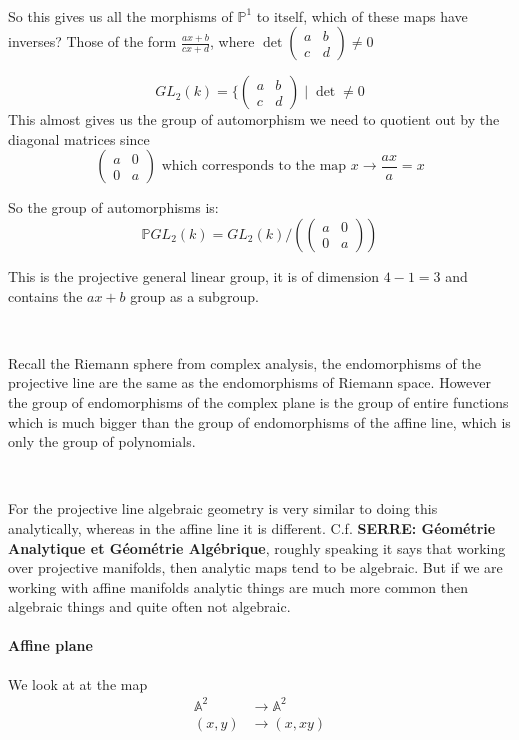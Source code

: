 \

So this gives us all the morphisms of $\mathbb{P}^1$ to itself, which of these maps have inverses? Those of the form $\frac{ax+b}{cx+d}$, where $\det\begin{pmatrix}
    a&b\\c&d
\end{pmatrix}\neq 0$

\[GL_2(k) = \{\begin{pmatrix}
    a&b\\c&d
\end{pmatrix}\mid \det\neq 0\]This almost gives us the group of automorphism we need to quotient out by the diagonal matrices since \[\begin{pmatrix}
    a&0\\0&a
\end{pmatrix} \text{ which corresponds to the map }x\rightarrow \frac{ax}{a} = x\]

So the group of automorphisms is:\[\mathbb{P}GL_2(k) = GL_2(k)/(\begin{pmatrix}
    a&0\\0&a
\end{pmatrix})\]

This is the projective general linear group, it is of dimension $4-1= 3$ and contains the $ax+b$ group as a subgroup.

\

Recall the Riemann sphere from complex analysis, the endomorphisms of the projective line are the same as the endomorphisms of Riemann space. 
However the group of endomorphisms of the complex plane is the group of entire functions which is much bigger than the group of endomorphisms of the affine line, which is only the group of polynomials. 

\

For the projective line algebraic geometry is very similar to doing this analytically, whereas in the affine line it is different. C.f. \textbf{SERRE: Géométrie Analytique et Géométrie Algébrique}, roughly speaking it says that working over projective manifolds, then analytic maps tend to be algebraic.
But if we are working with affine manifolds analytic things are much more common then algebraic things and quite often not algebraic.

\paragraph*{Affine plane}

We look at at the map \[\begin{array}{cc}
    \mathbb{A}^2&\rightarrow\mathbb{A}^2\\
    (x,y)&\rightarrow (x,xy)
\end{array}\]

